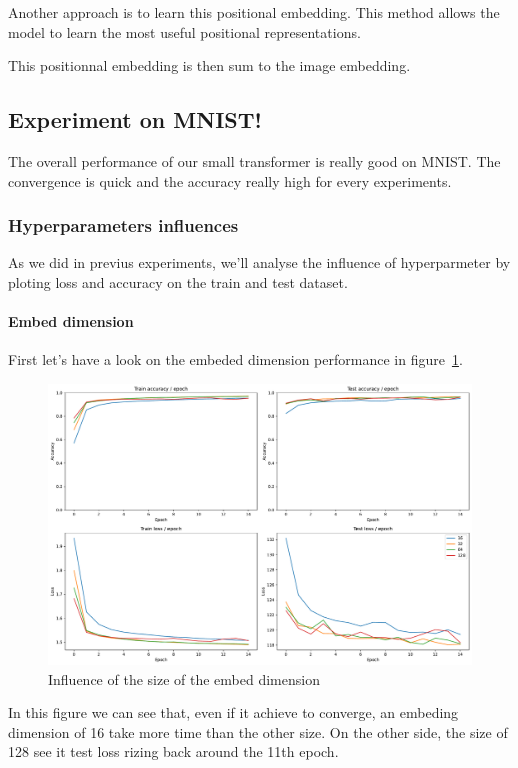 \documentclass{article}
\theoremstyle{plain}%
\theoremstyle{definition}
\theoremstyle{remark}
\begin{document}
Another approach is to learn this positional embedding. This method allows the model to learn the most useful positional representations.

This positionnal embedding is then sum to the image embedding.

\subsection{Experiment on MNIST!}
The overall performance of our small transformer is really good on MNIST. The convergence is quick and the accuracy really high for every experiments.

\subsubsection{Hyperparameters influences}
As we did in previus experiments, we'll analyse the influence of hyperparmeter by ploting loss and accuracy on the train and test dataset.

\paragraph{Embed dimension}
First let's have a look on the embeded dimension performance in figure~\ref*{fig:embed_dim_influence}.

\begin{figure}[H]
    \centering
    \includegraphics*[width=\textwidth]{figs/Transformers/embed_dim_influence.pdf}
    \caption{Influence of the size of the embed dimension}
    \label{fig:embed_dim_influence}
\end{figure}

In this figure we can see that, even if it achieve to converge, an embeding dimension of 16 take more time than the other size. On the other side, the size of 128 see it test loss rizing back around the 11th epoch.
\end{document}
